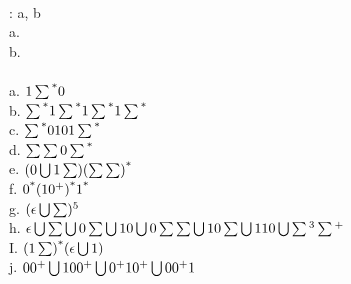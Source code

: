 \documentclass[12pt]{article}
\begin{document}
 \\


: a, b \\

a. \\

b. \\


 \\

a. $1\sum\textsuperscript{*}0$ \\

b. $\sum\textsuperscript{*}1\sum\textsuperscript{*}1\sum\textsuperscript{*}1\sum\textsuperscript{*}$ \\

c. $\sum\textsuperscript{*}0101\sum\textsuperscript{*}$ \\

d. $\sum\sum0\sum\textsuperscript{*}$ \\

e. $(0\bigcup1\sum)(\sum\sum)\textsuperscript{*}$ \\

f. $0\textsuperscript{*}(10\textsuperscript{+})\textsuperscript{*}1\textsuperscript{*}$ \\

g. $(\epsilon\bigcup\sum)\textsuperscript{5}$ \\

h. $\epsilon \bigcup \sum \bigcup 0 \sum \bigcup 10 \bigcup 0 \sum\sum \bigcup 10\sum \bigcup 110 \bigcup \sum \textsuperscript{3} \sum \textsuperscript{+} $ \\

I. $(1 \sum) \textsuperscript{*}(\epsilon \bigcup 1) $ \\

j. $00 \textsuperscript{+} \bigcup 100 \textsuperscript{+} \bigcup 0 \textsuperscript{+}
    10 \textsuperscript{+} \bigcup 00 \textsuperscript{+} 1 $ \\
\end{document}
